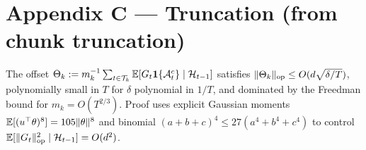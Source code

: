 \section{Appendix C --- Truncation (from chunk truncation)}

\begin{proposition}
\label{prop:theta_bound}
The offset $\Theta_k := m_k^{-1}\sum_{t\in\mathcal{T}_k}\mathbb{E}[G_t\mathbf 1\{\mathcal{A}_t^c\}\mid\mathcal{H}_{t-1}]$
satisfies $\|\Theta_k\|_{\mathrm{op}} \le O(d\sqrt{\delta/T})$, polynomially small
in $T$ for $\delta$ polynomial in $1/T$, and dominated by the Freedman
bound for $m_k = O(T^{2/3})$. Proof uses explicit Gaussian moments
$\mathbb{E}[(u^\top\theta)^8]=105\|\theta\|^8$ and binomial
$(a+b+c)^4\le 27(a^4+b^4+c^4)$ to control $\mathbb{E}[\|G_t\|_{\mathrm{op}}^2\mid\mathcal{H}_{t-1}]=O(d^2)$.
\end{proposition}


